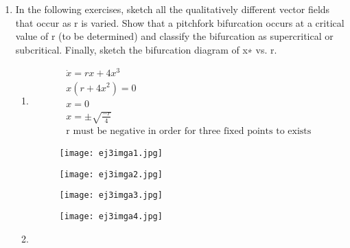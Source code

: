 \documentclass[a4paper,10pt]{article}
\begin{document}
\begin{enumerate}
\begin{enumerate}
        \end{enumerate}
        
        
    \item In the following exercises, sketch all the qualitatively different vector fields that occur as r is varied. Show that a pitchfork bifurcation occurs at a critical value of r (to be determined) and classify the bifurcation as supercritical or subcritical. Finally, sketch the bifurcation diagram of x∗ vs. r.
        \begin{enumerate}
            \item 
                \begin{equation}
                    \begin{aligned}
                        \dot{x}=rx + 4x^{3}\\
                        x(r+4x^{2})=0\\
                        x=0\\
                        x=\pm\sqrt{\frac{-r}{4}}\\
                        \text{r must be negative in order for three fixed points to exists}
                    \end{aligned}
                \end{equation}
                \begin{figure}[h]
                    \centering
                    \texttt{[image: ej3imga1.jpg]}
                    \label{fig:mesh1}
                \end{figure}
                \newpage
                \begin{figure}[h]
                    \centering
                    \texttt{[image: ej3imga2.jpg]}
                    \label{fig:mesh1}
                \end{figure}
                \begin{figure}[h]
                    \centering
                    \texttt{[image: ej3imga3.jpg]}
                    \label{fig:mesh1}
                \end{figure}
                \newpage
                \begin{figure}[h]
                    \centering
                    \texttt{[image: ej3imga4.jpg]}
                    \label{fig:mesh1}
                \end{figure}
                \newpage
            \item
                \begin{equation}

\end{equation}
\end{enumerate}
\end{enumerate}
\end{document}
